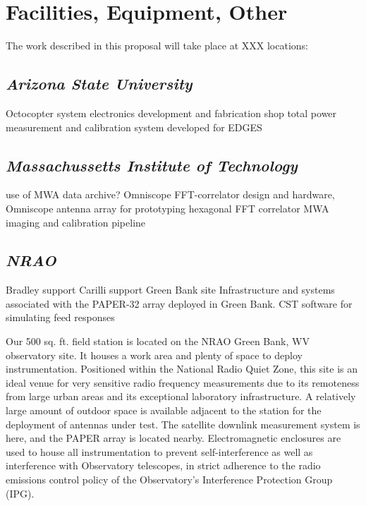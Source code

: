 \documentclass[11pt]{article}
\begin{document}
\pagestyle{empty}

\section*{Facilities, Equipment, Other}

The work described in this proposal will take place at XXX locations: 

\subsection*{\it Arizona State University}

Octocopter system
electronics development and fabrication shop
total power measurement and calibration system developed for EDGES

\subsection*{\it Massachussetts Institute of Technology}

use of MWA data archive?
Omniscope FFT-correlator design and hardware,
Omniscope antenna array for prototyping hexagonal FFT correlator
MWA imaging and calibration pipeline

\subsection*{\it NRAO} 

Bradley support
Carilli support
Green Bank site
Infrastructure and systems associated with the PAPER-32 array deployed in Green Bank.
CST software for simulating feed responses


Our 500 sq. ft. field station is located on the NRAO Green Bank, WV observatory
site. It houses a work area and plenty of space to deploy instrumentation.
Positioned within the National Radio Quiet Zone, this site is an ideal venue
for very sensitive radio frequency measurements due to its remoteness from
large urban areas and its exceptional laboratory infrastructure. A relatively
large amount of outdoor space is available adjacent to the station for the
deployment of antennas under test. The satellite downlink measurement system is
here, and the PAPER array is located nearby. Electromagnetic enclosures are
used to house all instrumentation to prevent self-interference as well as
interference with Observatory telescopes, in strict adherence to the radio
emissions control policy of the Observatory’s Interference Protection Group
(IPG).
\end{document}
